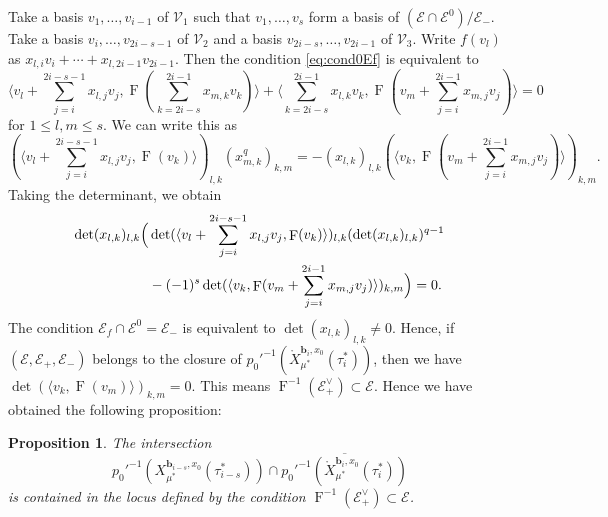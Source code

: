 \documentclass[12pt,a4paper]{article}
\newtheorem{prop}[thm]{Proposition}
\DeclareMathOperator{\oF}{F}
\newcommand{\bfb}{\mathbf{b}}
\newcommand{\cE}{\mathcal{E}}
\newcommand{\cV}{\mathcal{V}}
\newcommand{\ol}{\overline}
\begin{document}
Take a basis $v_1,\ldots,v_{i-1}$ of $\cV_1$ 
such that $v_1,\ldots ,v_s$ form a basis of $(\cE \cap \cE^0)/\cE_-$. 
Take a basis $v_i,\ldots,v_{2i-s-1}$ of $\cV_2$ and 
a basis $v_{2i-s},\ldots ,v_{2i-1}$ of $\cV_3$. 
Write $f(v_l)$ as $x_{l,i} v_i + \cdots + x_{l,2i-1} v_{2i-1}$. 
Then the condition \eqref{eq:cond0Ef} is equivalent to 
\begin{equation*}
 \langle v_l +\sum_{j=i}^{2i-s-1} x_{l,j} v_j, \oF (\sum_{k=2i-s}^{2i-1} x_{m,k}v_k ) \rangle + 
 \langle \sum_{k=2i-s}^{2i-1} x_{l,k} v_k, \oF (v_m+\sum_{j=i}^{2i-1} x_{m,j} v_j) \rangle 
 =0 
\end{equation*}
for $1 \leq l,m \leq s$. 
We can write this as 
\[
 (\langle v_l +\sum_{j=i}^{2i-s-1} x_{l,j} v_j, \oF ( v_k ) \rangle)_{l,k} 
 (x_{m,k}^q)_{k,m} =
 -( x_{l,k})_{l,k} ( \langle v_k, \oF (v_m+\sum_{j=i}^{2i-1} x_{m,j} v_j) \rangle )_{k,m}. 
\]
Taking the determinant, we obtain 
\begin{align*}
 \det (x_{l,k})_{l,k} \Bigl( 
 & 
 \det (\langle v_l +\sum_{j=i}^{2i-s-1} x_{l,j} v_j, \oF ( v_k ) \rangle)_{l,k} 
 (\det (x_{l,k})_{l,k})^{q-1} \\
 &-(-1)^s 
 \det ( \langle v_k, \oF (v_m+\sum_{j=i}^{2i-1} x_{m,j} v_j) \rangle )_{k,m} 
 \Bigr) =0. 
\end{align*}
The condition $\cE_f \cap \cE^0=\cE_-$ is equivalent 
to $\det (x_{l,k})_{l,k} \neq 0$. 
Hence, 
if $(\cE,\cE_+,\cE_-)$ belongs to 
the closure of $p_0'^{-1}(\mathring{X}_{\mu^*}^{\bfb_i,x_0}(\tau_i^*))$, 
then we have 
$\det ( \langle v_k, \oF (v_m ) \rangle )_{k,m} =0$. 
This means 
$\oF^{-1}(\cE_+^{\vee}) \subset \cE$. 
Hence we have obtained the following proposition: 

\begin{prop}
The intersection 
\[
 p_0'^{-1}(X_{\mu^*}^{\bfb_{i-s},x_0}(\tau_{i-s}^*)) \cap 
\ol{p_0'^{-1}(\mathring{X}_{\mu^*}^{\bfb_i,x_0}(\tau_i^*))} 
\]
is contained in the locus defined by 
the condition $\oF^{-1}(\cE_+^{\vee}) \subset \cE$. 
\end{prop}
\end{document}
